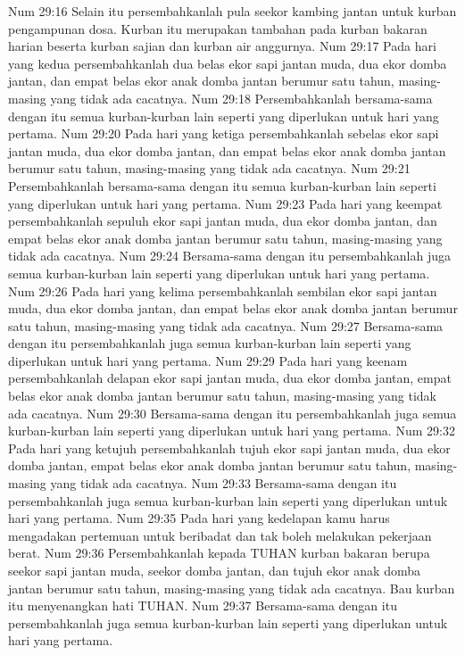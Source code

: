 Num 29:16  Selain itu persembahkanlah pula seekor kambing jantan untuk kurban pengampunan dosa. Kurban itu merupakan tambahan pada kurban bakaran harian beserta kurban sajian dan kurban air anggurnya.
Num 29:17  Pada hari yang kedua persembahkanlah dua belas ekor sapi jantan muda, dua ekor domba jantan, dan empat belas ekor anak domba jantan berumur satu tahun, masing-masing yang tidak ada cacatnya.
Num 29:18  Persembahkanlah bersama-sama dengan itu semua kurban-kurban lain seperti yang diperlukan untuk hari yang pertama.
Num 29:20  Pada hari yang ketiga persembahkanlah sebelas ekor sapi jantan muda, dua ekor domba jantan, dan empat belas ekor anak domba jantan berumur satu tahun, masing-masing yang tidak ada cacatnya.
Num 29:21  Persembahkanlah bersama-sama dengan itu semua kurban-kurban lain seperti yang diperlukan untuk hari yang pertama.
Num 29:23  Pada hari yang keempat persembahkanlah sepuluh ekor sapi jantan muda, dua ekor domba jantan, dan empat belas ekor anak domba jantan berumur satu tahun, masing-masing yang tidak ada cacatnya.
Num 29:24  Bersama-sama dengan itu persembahkanlah juga semua kurban-kurban lain seperti yang diperlukan untuk hari yang pertama.
Num 29:26  Pada hari yang kelima persembahkanlah sembilan ekor sapi jantan muda, dua ekor domba jantan, dan empat belas ekor anak domba jantan berumur satu tahun, masing-masing yang tidak ada cacatnya.
Num 29:27  Bersama-sama dengan itu persembahkanlah juga semua kurban-kurban lain seperti yang diperlukan untuk hari yang pertama.
Num 29:29  Pada hari yang keenam persembahkanlah delapan ekor sapi jantan muda, dua ekor domba jantan, empat belas ekor anak domba jantan berumur satu tahun, masing-masing yang tidak ada cacatnya.
Num 29:30  Bersama-sama dengan itu persembahkanlah juga semua kurban-kurban lain seperti yang diperlukan untuk hari yang pertama.
Num 29:32  Pada hari yang ketujuh persembahkanlah tujuh ekor sapi jantan muda, dua ekor domba jantan, empat belas ekor anak domba jantan berumur satu tahun, masing-masing yang tidak ada cacatnya.
Num 29:33  Bersama-sama dengan itu persembahkanlah juga semua kurban-kurban lain seperti yang diperlukan untuk hari yang pertama.
Num 29:35  Pada hari yang kedelapan kamu harus mengadakan pertemuan untuk beribadat dan tak boleh melakukan pekerjaan berat.
Num 29:36  Persembahkanlah kepada TUHAN kurban bakaran berupa seekor sapi jantan muda, seekor domba jantan, dan tujuh ekor anak domba jantan berumur satu tahun, masing-masing yang tidak ada cacatnya. Bau kurban itu menyenangkan hati TUHAN.
Num 29:37  Bersama-sama dengan itu persembahkanlah juga semua kurban-kurban lain seperti yang diperlukan untuk hari yang pertama.
